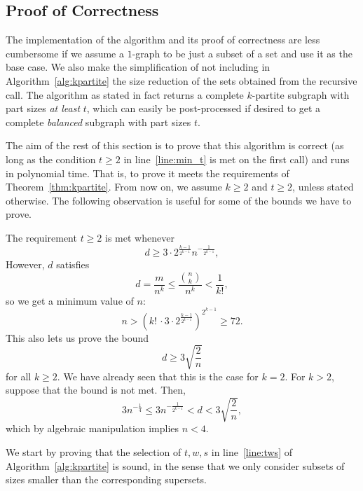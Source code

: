\subsection{Proof of Correctness} \label{subsec:proof-of-correctness}

The implementation of the algorithm and its proof of correctness are less cumbersome if we assume
a $1$-graph to be just a subset of a set and use it as the base case.
We also make the simplification of not including in Algorithm~\ref{alg:kpartite}
the size reduction of the sets obtained from the recursive call.
The algorithm as stated in fact returns a complete $k$-partite
subgraph with part sizes \emph{at least} $t$, which can easily be post-processed
if desired to get a complete \emph{balanced} subgraph with part sizes $t$.

The aim of the rest of this section is to prove that this algorithm is correct
(as long as the  condition $t \geq 2$ in line~\ref{line:min_t} is met on the first call)
and runs in polynomial time.
That is, to prove it meets the requirements of Theorem~\ref{thm:kpartite}.
From now on, we assume $k \geq 2$ and
$t \geq 2$, unless stated otherwise.
The following observation is useful for some of the bounds we have to prove.

\begin{remark}\label{rm:min_d}
    The requirement $t \geq 2$ is met whenever
    \[
        d \geq 3 \cdot 2^{\frac{k - 1}{2^{k-1}}} n^{-\frac{1}{2^{k-1}}},
    \]
    However, $d$ satisfies
    \[
        d = \frac{m}{n^k} \leq \frac{\binom{n}{k}}{n^k} < \frac{1}{k!},
    \]
    so we get a minimum value of $n$:
    \[
        n > \left( k!\, \cdot 3 \cdot 2^{\frac{k-1}{2^{k-1}}} \right)^{2^{k-1}} \geq 72.
    \]
    This also lets us prove the bound
    \[
        d \geq 3 \sqrt{\frac{2}{n}}
    \]
    for all $k \geq 2$.
    We have already seen that this is the case for $k=2$.
    For $k > 2$, suppose that the bound is not met.
    Then,
    \[
       3 n^{-\frac{1}{4}} \leq 3 n^{-\frac{1}{2^{k-1}}} < d < 3 \sqrt{\frac{2}{n}},
    \]
    which by algebraic manipulation implies $n < 4$.
\end{remark}

We start by proving that the selection of $t, w, s$ in line~\ref{line:tws} of Algorithm~\ref{alg:kpartite}
is sound, in the sense that we only consider subsets of sizes smaller than the corresponding supersets.


